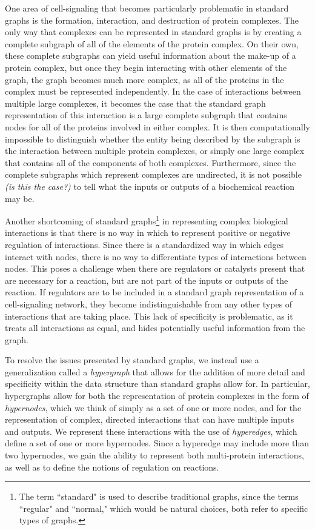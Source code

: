 \documentclass[12pt,twoside]{reedthesis}
\begin{document}
One area of cell-signaling that becomes particularly problematic in standard graphs is the formation, interaction, and destruction of protein complexes.  The only way that complexes can be represented in standard graphs is by creating a complete subgraph of all of the elements of the protein complex.  On their own, these complete subgraphs can yield useful information about the make-up of a protein complex, but once they begin interacting with other elements of the graph, the graph becomes much more complex, as all of the proteins in the complex must be represented independently.  In the case of interactions between multiple large complexes, it becomes the case that the standard graph representation of this interaction is a large complete subgraph that contains nodes for all of the proteins involved in either complex.  It is then computationally impossible to distinguish whether the entity being described by the subgraph is the interaction between multiple protein complexes, or simply one large complex that contains all of the components of both complexes.  Furthermore, since the complete subgraphs which represent complexes are undirected, it is not possible \textit{(is this the case?)} to tell what the inputs or outputs of a biochemical reaction may be. 

Another shortcoming of standard graphs\footnote{The term ``standard" is used to describe traditional graphs, since the terms ``regular" and ``normal," which would be natural choices, both refer to specific types of graphs.} in representing complex biological interactions is that there is no way in which to represent positive or negative regulation of interactions.  Since there is a standardized way in which edges interact with nodes, there is no way to differentiate types of interactions between nodes.  This poses a challenge when there are regulators or catalysts present that are necessary for a reaction, but are not part of the inputs or outputs of the reaction.  If regulators are to be included in a standard graph representation of a cell-signaling network, they become indistinguishable from any other types of interactions that are taking place.  This lack of specificity is problematic, as it treats all interactions as equal, and hides potentially useful information from the graph.

To resolve the issues presented by standard graphs, we instead use a generalization called a \textit{hypergraph} that allows for the addition of more detail  and specificity within the data structure than standard graphs allow for.  In particular, hypergraphs allow for both the representation of protein complexes in the form of \textit{hypernodes}, which we think of simply as a set of one or more nodes, and for the representation of complex, directed interactions that can have multiple inputs and outputs.  We represent these interactions with the use of \textit{hyperedges}, which define a set of one or more hypernodes.  Since a hyperedge may include more than two hypernodes, we gain the ability to represent both multi-protein interactions, as well as to define the notions of regulation on reactions.
\end{document}
